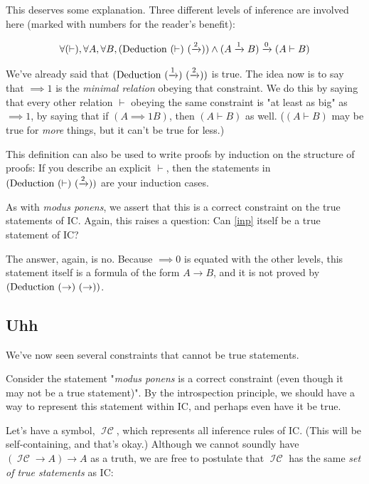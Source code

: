 \documentclass{article}
\begin{document}
  This deserves some explanation. Three different levels of inference are involved here (marked with numbers for the reader's benefit):
  
  \begin{align*}
    \forall (\vdash), \forall A,\forall B,  (\deduction\ (\vdash)\ (\implies{2})) \wedge (A \implies{1} B) \implies{0} (A \vdash B)\\
  \end{align*}
  
  We've already said that $(\deduction\ (\implies{1})\ (\implies{2}))$ is true. The idea now is to say that $\implies{1}$ is the \emph{minimal relation} obeying that constraint. We do this by saying that every other relation $\vdash$ obeying the same constraint is "at least as big" as $\implies{1}$, by saying that if $(A \implies{1} B)$, then $(A \vdash B)$ as well. ($(A \vdash B)$ may be true for \emph{more} things, but it can't be true for less.)
  
  This definition can also be used to write proofs by induction on the structure of proofs: If you describe an explicit $\vdash$, then the statements in $(\deduction\ (\vdash)\ (\implies{2}))$ are your induction cases.
  
  As with \emph{modus ponens}, we assert that this is a correct constraint on the true statements of IC. Again, this raises a question: Can \eqref{inp} itself be a true statement of IC?
  
  The answer, again, is no. Because $\implies{0}$ is equated with the other levels, this statement itself is a formula of the form $A \to B$, and it is not proved by $(\deduction\ (\to)\ (\to))$.
  
  
  \subsection{Uhh}
  
  We've now seen several constraints that cannot be true statements.
  
  Consider the statement "\emph{modus ponens} is a correct constraint (even though it may not be a true statement)". By the introspection principle, we should have a way to represent this statement within IC, and perhaps even have it be true.
  
  \newcommand{\icset}{\operatorname{\mathcal{IC}}}
  Let's have a symbol, $\icset$, which represents all inference rules of IC. (This will be self-containing, and that's okay.) Although we cannot soundly have $(\icset \to A) \to A$ as a truth, we are free to postulate that $\icset$ has the same \emph{set of true statements} as IC:
  
\end{document}
